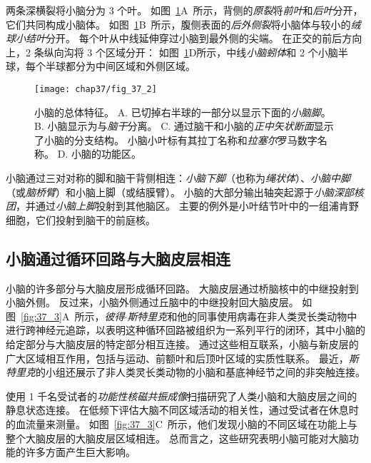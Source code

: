 两条深横裂将小脑分为 3 个叶。
如图~\ref{fig:37_2}A~所示，背侧的\textit{原裂}将\textit{前叶}和\textit{后叶}分开，它们共同构成小脑体。
如图~\ref{fig:37_2}B~所示，腹侧表面的\textit{后外侧裂}将小脑体与较小的\textit{绒球小结叶}分开。
每个叶从中线延伸穿过小脑到最外侧的尖端。
在正交的前后方向上，2 条纵向沟将 3 个区域分开：
如图~\ref{fig:37_2}D所示，中线\textit{小脑蚓体}和 2 个小脑半球，每个半球都分为中间区域和外侧区域。


\begin{figure}[htbp]
	\centering
	\texttt{[image: chap37/fig\_37\_2]}
	\caption{小脑的总体特征\cite{nieuwenhuys2007human}。
		A. 已切掉右半球的一部分以显示下面的\textit{小脑脚}。
		B. 小脑显示为与\textit{脑干}分离。
		C. 通过脑干和小脑的\textit{正中矢状断面}显示了小脑的分支结构。
		小脑小叶标有其拉丁名称和\textit{拉塞尔}罗马数字名称\cite{larsell1972comparative}。
		D. 小脑的功能区。}
	\label{fig:37_2}
\end{figure}


小脑通过三对对称的脚和脑干背侧相连：\textit{小脑下脚}（也称为\textit{绳状体}）、\textit{小脑中脚}（或\textit{脑桥臂}）和小脑上脚（或结膜臂）。
小脑的大部分输出轴突起源于\textit{小脑深部核团}，并通过\textit{小脑上脚}投射到其他脑区。
主要的例外是小叶结节叶中的一组浦肯野细胞，它们投射到脑干的前庭核。

\subsection{小脑通过循环回路与大脑皮层相连}

小脑的许多部分与大脑皮层形成循环回路。
大脑皮层通过桥脑核中的中继投射到小脑外侧。
反过来，小脑外侧通过丘脑中的中继投射回大脑皮层。
如图~\ref{fig:37_3}A~所示，\textit{彼得$\cdot$斯特里克}和他的同事使用病毒在非人类灵长类动物中进行跨神经元追踪，以表明这种循环回路被组织为一系列平行的闭环，其中小脑的给定部分与大脑皮层的特定部分相互连接。
通过这些相互联系，小脑与新皮层的广大区域相互作用，包括与运动、前额叶和后顶叶区域的实质性联系。
最近，\textit{斯特里克}的小组还展示了非人类灵长类动物的小脑和基底神经节之间的非突触连接。


使用 1 千名受试者的\textit{功能性核磁共振成像}扫描研究了人类小脑和大脑皮层之间的静息状态连接。
在低频下评估大脑不同区域活动的相关性，通过受试者在休息时的血流量来测量。
如图~\ref{fig:37_3}C~所示，他们发现小脑的不同区域在功能上与整个大脑皮层的大脑皮层区域相连。
总而言之，这些研究表明小脑可能对大脑功能的许多方面产生巨大影响。


